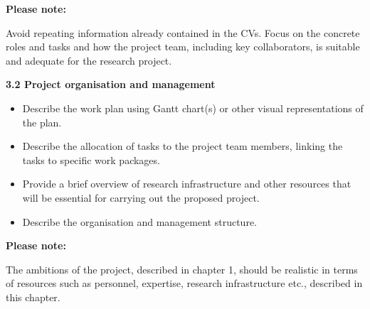 \documentclass{nfr}
\begin{document}
\textbf{Please note:}

Avoid repeating information already contained in the CVs. Focus on the
concrete roles and tasks and how the project team, including key
collaborators, is suitable and adequate for the research project.

\textbf{3.2 Project organisation and management}

\begin{itemize}
\item
  Describe the work plan using Gantt chart(s) or other visual
  representations of the plan.
\item
  Describe the allocation of tasks to the project team members, linking
  the tasks to specific work packages.
\item
  Provide a brief overview of research infrastructure and other
  resources that will be essential for carrying out the proposed
  project.
\item
  Describe the organisation and management structure.
\end{itemize}

\textbf{Please note:}

The ambitions of the project, described in chapter 1, should be
realistic in terms of resources such as personnel, expertise, research
infrastructure etc., described in this chapter.
\end{document}
